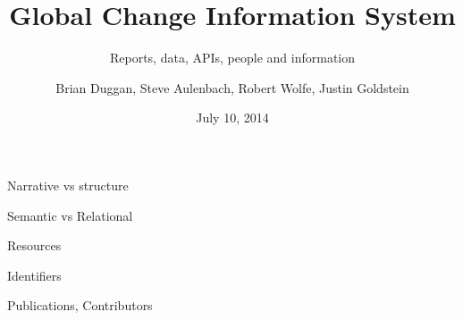 \documentclass{beamer}
\begin{document}
\title{Global Change Information System}   
\subtitle{Reports, data, APIs, people and information}
\author{Brian Duggan, Steve Aulenbach, Robert Wolfe, Justin Goldstein} 
\date{July 10, 2014} 

\frame{\titlepage} 

\begin{frame}
    \begin{center}
        \Huge Narrative vs structure
    \end{center}
\end{frame}

\begin{frame}
    \begin{center}
        \Huge Semantic vs Relational
    \end{center}
\end{frame}

\begin{frame}
    \begin{center}
        \Huge Resources
    \end{center}
\end{frame}

\begin{frame}
    \begin{center}
        \Huge Identifiers
    \end{center}
\end{frame}

\begin{frame}
    \begin{center}
        \Huge Publications, Contributors
    \end{center}
\end{frame}
\end{document}
